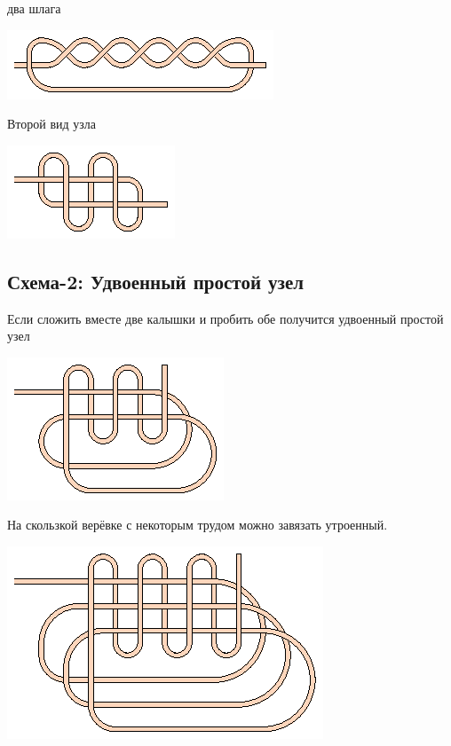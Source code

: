 два шлага

\includegraphics[scale=2]{images/blood-2.eps}

Второй вид узла

\includegraphics[scale=2]{images/blood-1-v2.eps}


\subsection{Схема-2: Удвоенный простой узел}

Если сложить вместе две калышки и пробить обе получится удвоенный простой узел

\includegraphics[scale=2]{images/double-simple-2-2.eps}

На скользкой верёвке с некоторым трудом можно завязать утроенный.

\includegraphics[scale=2]{images/double-simple-3-3.eps}
